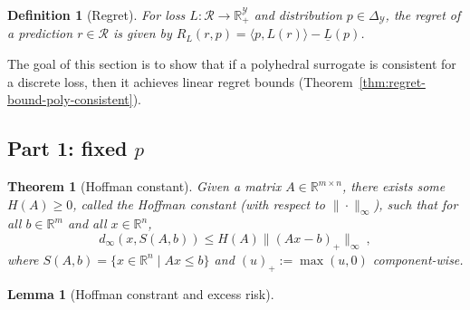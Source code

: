 \documentclass[12pt]{article}
\newcommand{\reals}{\mathbb{R}}
\newcommand{\simplex}{\Delta_\Y}
\newcommand{\R}{\mathcal{R}}
\newcommand{\Y}{\mathcal{Y}}
\newcommand{\risk}[1]{\underline{#1}}
\newcommand{\inprod}[2]{\langle #1, #2 \rangle}%
\newtheorem{theorem}{Theorem}
\newtheorem{lemma}{Lemma}
\newtheorem{definition}{Definition}
\begin{document}
\begin{definition}[Regret]\label{def:regret}
  For loss $L:\R\to\reals^\Y_+$ and distribution $p\in\simplex$, the \emph{regret} of a prediction $r\in\R$ is given by $R_L(r,p) = \inprod{p}{L(r)} - \risk{L}(p)$.
\end{definition}

The goal of this section is to show that if a polyhedral surrogate is consistent for a discrete loss, then it achieves linear regret bounds (Theorem~\ref{thm:regret-bound-poly-consistent}).

\subsection{Part 1: fixed $p$}

\begin{theorem}[Hoffman constant]
  \label{thm:hoffman}
  Given a matrix $A\in\reals^{m\times n}$, there exists some $H(A)\geq 0$, called the \emph{Hoffman constant} (with respect to $\|\cdot\|_\infty$), such that for all $b\in\reals^m$ and all $x\in\reals^n$,
  \begin{equation}
    \label{eq:hoffman}
    d_\infty(x,S(A,b)) \leq H(A) \|(A x - b)_+\|_\infty~,
  \end{equation}
  where $S(A,b) = \{x\in\reals^n \mid A x \leq b\}$ and $(u)_+ := \max(u,0)$ component-wise.
\end{theorem}

\begin{lemma}[Hoffman constrant and excess risk]
  
\end{lemma}
\end{document}

